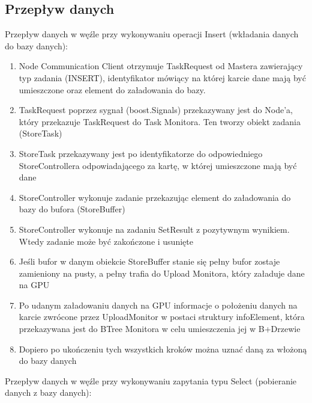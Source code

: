 \documentclass[paper=a4, fontsize=11pt]{scrartcl} %
\numberwithin{equation}{section} %
\numberwithin{figure}{section} %
\numberwithin{table}{section} %
\begin{document}
	\subsection{Przepływ danych}
		Przepływ danych w węźle przy wykonywaniu operacji Insert (wkładania danych do bazy danych):
		\begin{enumerate}
			\item Node Communication Client otrzymuje TaskRequest od Mastera zawierający typ zadania (INSERT), identyfikator mówiący 
				na której karcie dane mają być umieszczone oraz element do załadowania do bazy.
			\item TaskRequest poprzez sygnał (boost.Signals) przekazywany jest do Node'a, który przekazuje TaskRequest do Task Monitora. Ten tworzy 
				obiekt zadania (StoreTask)
			\item StoreTask przekazywany jest po identyfikatorze do odpowiedniego StoreControllera odpowiadającego za kartę, w której umieszczone mają być dane
			\item StoreController wykonuje zadanie przekazując element do załadowania do bazy do bufora (StoreBuffer)
			\item StoreController wykonuje na zadaniu SetResult z pozytywnym wynikiem. Wtedy zadanie może być zakończone i usunięte
			\item Jeśli bufor w danym obiekcie StoreBuffer stanie się pełny bufor zostaje zamieniony na pusty, a pełny trafia do Upload Monitora, który załaduje dane na GPU
			\item Po udanym załadowaniu danych na GPU informacje o położeniu danych na karcie zwrócone przez UploadMonitor w postaci struktury infoElement, która przekazywana jest do
				BTree Monitora w celu umieszczenia jej w B+Drzewie 
			\item Dopiero po ukończeniu tych wszystkich kroków można uznać daną za włożoną do bazy danych
		\end{enumerate}
		Przepływ danych w węźle przy wykonywaniu zapytania typu Select (pobieranie danych z bazy danych):
\end{document}
